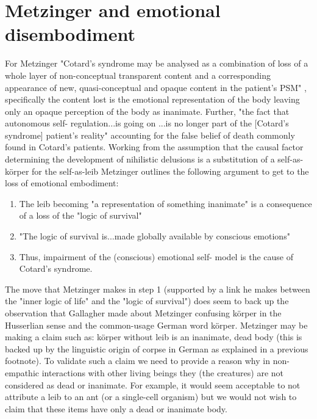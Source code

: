 \section{Metzinger and emotional disembodiment}
\label{metzinger_emotional_disembodiment}

For Metzinger "Cotard's syndrome may be analysed as a combination of loss of a whole layer of non-conceptual transparent content and a corresponding appearance of new, quasi-conceptual and opaque content in the patient's PSM" \cite[p. 458]{metzinger2003}, specifically the content lost is the emotional representation of the body leaving only an opaque perception of the body as inanimate. Further, "the fact that autonomous self- regulation...is going on ...is no longer part of the [Cotard's syndrome] patient's reality" \cite[p. 459]{metzinger2003} accounting for the false belief of death commonly found in Cotard's patients. Working from the assumption that the causal factor determining the development of nihilistic delusions is a substitution of a self-as-k\"{o}rper for the self-as-leib Metzinger outlines the following argument to get to the loss of emotional embodiment:

\begin{enumerate}
    \item The leib becoming "a representation of something inanimate" is a consequence of a loss of the "logic of survival" \cite[p. 457]{metzinger2003}
    \item "The logic of survival is...made globally available by conscious emotions" \cite[p. 457]{metzinger2003}
    \item Thus, impairment of the (conscious) emotional self- model is the cause of Cotard's syndrome.
\end{enumerate}

The move that Metzinger makes in step 1 (supported by a link he makes between the "inner logic of life" and the "logic of survival") does seem to back up the observation that Gallagher made about Metzinger confusing k\"{o}rper in the Husserlian sense and the common-usage German word k\"{o}rper. Metzinger may be making a claim such as: k\"{o}rper without leib is an inanimate, dead body (this is backed up by the linguistic origin of corpse in German as explained in a previous footnote). To validate such a claim we need to provide a reason why in non-empathic interactions with other living beings they (the creatures) are not considered as dead or inanimate. For example, it would seem acceptable to not attribute a leib to an ant (or a single-cell organism) but we would not wish to claim that these items have only a dead or inanimate body.

